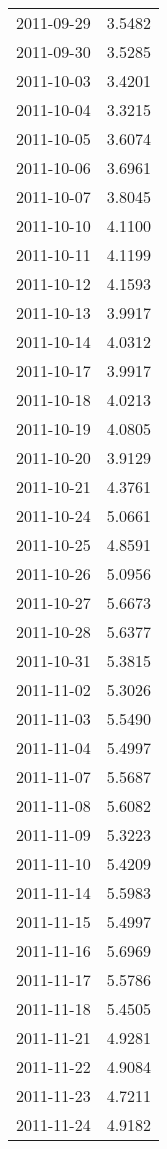 \begin{tabular}{lr}
2011-09-29 &      3.5482 \\
2011-09-30 &      3.5285 \\
2011-10-03 &      3.4201 \\
2011-10-04 &      3.3215 \\
2011-10-05 &      3.6074 \\
2011-10-06 &      3.6961 \\
2011-10-07 &      3.8045 \\
2011-10-10 &      4.1100 \\
2011-10-11 &      4.1199 \\
2011-10-12 &      4.1593 \\
2011-10-13 &      3.9917 \\
2011-10-14 &      4.0312 \\
2011-10-17 &      3.9917 \\
2011-10-18 &      4.0213 \\
2011-10-19 &      4.0805 \\
2011-10-20 &      3.9129 \\
2011-10-21 &      4.3761 \\
2011-10-24 &      5.0661 \\
2011-10-25 &      4.8591 \\
2011-10-26 &      5.0956 \\
2011-10-27 &      5.6673 \\
2011-10-28 &      5.6377 \\
2011-10-31 &      5.3815 \\
2011-11-02 &      5.3026 \\
2011-11-03 &      5.5490 \\
2011-11-04 &      5.4997 \\
2011-11-07 &      5.5687 \\
2011-11-08 &      5.6082 \\
2011-11-09 &      5.3223 \\
2011-11-10 &      5.4209 \\
2011-11-14 &      5.5983 \\
2011-11-15 &      5.4997 \\
2011-11-16 &      5.6969 \\
2011-11-17 &      5.5786 \\
2011-11-18 &      5.4505 \\
2011-11-21 &      4.9281 \\
2011-11-22 &      4.9084 \\
2011-11-23 &      4.7211 \\
2011-11-24 &      4.9182 \\

\end{tabular}
